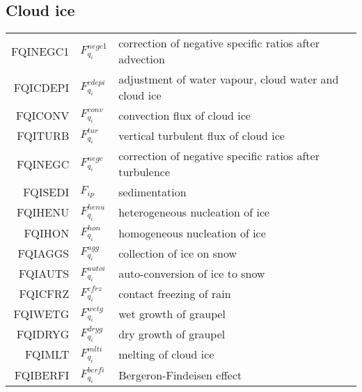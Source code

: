   \subsection{Cloud ice}
  \begin{tabular}{rll}

       FQINEGC1     &$F_{q_i}^{negc1}$ &correction of negative specific ratios after advection\\
       FQICDEPI     &$F_{q_i}^{cdepi}$ &adjustment of water vapour, cloud water and cloud ice\\
       FQICONV      &$F_{q_i}^{conv}$ &convection flux of cloud ice\\
       FQITURB      &$F_{q_i}^{tur}$  &vertical turbulent flux of cloud ice\\
       FQINEGC      &$F_{q_i}^{negc}$ &correction of negative specific ratios after turbulence\\
       FQISEDI      &$F_{ip}$ &sedimentation\\
       FQIHENU      &$F_{q_i}^{henu}$ &heterogeneous nucleation of ice\\
       FQIHON       &$F_{q_i}^{hon}$ &homogeneous nucleation of ice\\
       FQIAGGS      &$F_{q_i}^{agg}$ &collection of ice on snow\\
       FQIAUTS      &$F_{q_i}^{autoi}$ &auto-conversion of ice to snow\\
       FQICFRZ      &$F_{q_i}^{cfrz}$ &contact freezing of rain\\
       FQIWETG      &$F_{q_i}^{wetg}$ &wet growth of graupel\\
       FQIDRYG      &$F_{q_i}^{dryg}$ &dry growth of graupel\\
       FQIMLT       &$F_{q_i}^{mlti}$ &melting of cloud ice\\
       FQIBERFI     &$F_{q_i}^{berfi}$ &Bergeron-Findeisen effect\\

  \end{tabular}

